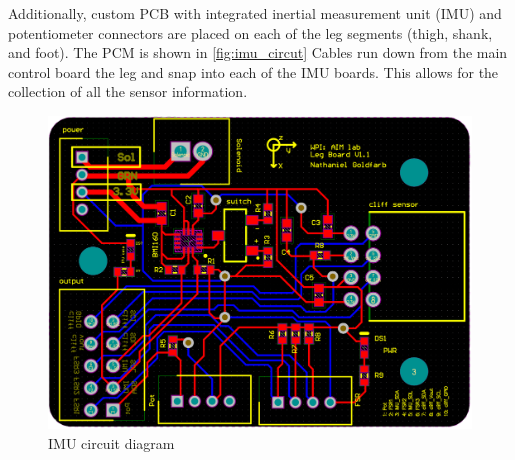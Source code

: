 Additionally, custom PCB with integrated inertial measurement unit (IMU) and potentiometer connectors are placed on each of the leg segments (thigh, shank, and foot). The PCM is shown in \autoref{fig:imu_circut} Cables run down from the main control board the leg and snap into each of the IMU boards. This allows for the collection of all the sensor information.  

\begin{figure}
    \centering
    \includegraphics[scale=0.18]{images/mech_design/IMU_circut_edit.png}
    \caption{IMU circuit diagram}
    \label{fig:imu_circut}
\end{figure}

